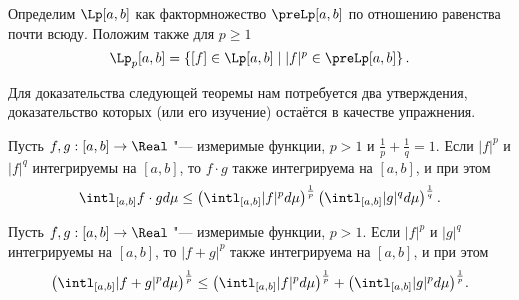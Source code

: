 \documentclass[main]{subfiles}
\begin{document}
Определим \( \Lp[a, b] \) как
фактормножество \( \preLp[a, b] \)
по отношению равенства почти всюду.
Положим также для \( p \ge 1 \)
\[
  \Lp_p[a, b] = \left\{
    [f] \in \Lp[a, b]
    \mid
    |f|^p \in \preLp[a, b]
  \right\}.
\]

Для доказательства следующей теоремы
нам потребуется два утверждения,
доказательство которых (или его изучение)
остаётся в качестве упражнения.

\begin{proposition}
  Пусть \( f, g : [a, b] \to \Real \) "---
  измеримые функции, \( p > 1 \) и
  \( \frac1p + \frac1q = 1 \).
  Если \( |f|^p \) и \( |f|^q \) интегрируемы на \( [a, b] \),
  то \( f \cdot g \) также интегрируема на \( [a, b] \),
  и при этом
  \[
    \intl_{[a, b]} f \cdot g d\mu \le
    \left( \intl_{[a,b]} |f|^p d\mu \right)^{\frac1p}
    \left( \intl_{[a,b]} |g|^q d\mu \right)^{\frac1q}.
  \]
\end{proposition}

\begin{proposition}
  Пусть \( f, g : [a, b] \to \Real \) "---
  измеримые функции, \( p > 1 \).
  Если \( |f|^p \) и \( |g|^q \) интегрируемы на \( [a, b] \),
  то \( |f + g|^p \) также интегрируема на \( [a, b] \),
  и при этом
  \[
    {\left( \intl_{[a, b]} |f + g|^p d\mu \right)}^{\frac1p} \le
    {\left( \intl_{[a,b]} |f|^p d\mu \right)}^{\frac1p}
    +
    {\left( \intl_{[a,b]} |g|^p d\mu \right)}^{\frac1p}.
  \]
\end{proposition}
\end{document}
